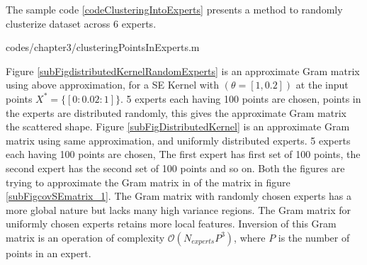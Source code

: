 The sample code \ref{codeClusteringIntoExperts} presents a method to randomly clusterize dataset across $6$ experts.
\begin{mdframed}[hidealllines=true,backgroundcolor=lightgray!20]

                    {codes/chapter3/clusteringPointsInExperts.m}
\end{mdframed}

Figure \ref{subFigdistributedKernelRandomExperts} is an approximate Gram matrix using above approximation, for a SE Kernel with $(\theta = [1, 0.2])$ at the input points $X^{*} = \{[0:0.02:1]\}$. 5 experts each having 100 points are chosen, points in the experts are distributed randomly, this gives the approximate Gram matrix the scattered shape. Figure \ref{subFigDistributedKernel} is an approximate Gram matrix using same approximation, and uniformly distributed experts. 5 experts each having 100 points are chosen, The first expert has first set of 100 points, the second expert has the second set of 100 points and so on. Both the figures are trying to approximate the Gram matrix in of the matrix in figure \ref{subFigcovSEmatrix_1}. The Gram matrix with randomly chosen experts has a more global nature but lacks many high variance regions. The Gram matrix for uniformly chosen experts retains more local features. Inversion of this Gram matrix is an operation of complexity $\mathcal{O}(N_{experts}P^{3})$, where $P$ is the number of points in an expert.

